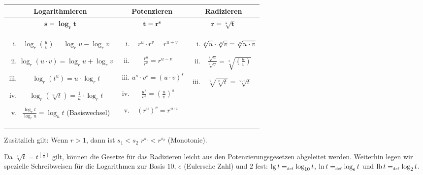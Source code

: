 \begin{center}
\begin{tabular}{c|c|c}
Logarithmieren & Potenzieren & Radizieren\\
\hline
$\mathbf{s = \log_r t}$ & $\mathbf{t = r^s}$ &
\phantom{$\left(\frac{\frac{c}{d}a}{b}\right)$} $\mathbf{r = \sqrt[\mathbf{s}]{\mathbf{t}}}$\\
\hline
\begin{minipage}[t]{0.38\textwidth}
\begin{enumerate}[i)]
%
\item $\log_r (\frac{u}{v}) = \log_r u - \log_r v$
%
\item $\log_r ({u} \cdot {v}) = \log_r u + \log_r v$
%
\item $\log_r (t^u) = u \cdot \log_r t$
%
\item $\log_r (\sqrt[u]{t}) = \frac{1}{u} \cdot \log_r t$
%
\item $\frac{\log_r t}{\log_r u} = \log_u t$ (Basiswechsel)
%
\end{enumerate}
\end{minipage}
&
\begin{minipage}[t]{0.25\textwidth}
\begin{enumerate}[i)]
%
\item $r^{u} \cdot r^{v} = r^{u + v}$
%
\item $\frac{r^{u}}{r^{v}} = r^{u - v}$
%
\item $u^{s} \cdot v^{s} = (u \cdot v)^{s}$
%
\item $\frac{u^{s}}{v^{s}} = \left(\frac{u}{v}\right)^{s}$
%
\item $(r^{u})^{v} = r^{u \cdot v}$ 
%
\end{enumerate}
\end{minipage}
&
\begin{minipage}[t]{0.28\textwidth}
%
\begin{enumerate}[i)]
%
\item $\sqrt[\leftroot{1} s]{u} \cdot \sqrt[s]{v} = \sqrt[s]{u \cdot v}$
%
\item $\frac{\sqrt[s]{u}}{\sqrt[s]{v}} = \sqrt[s]{\left(\frac{u}{v}\right)}$
%
\item $\sqrt[u]{\sqrt[v]{t}} =
  \sqrt[u \cdot v]{t}$
%
\end{enumerate}
\end{minipage}\\
\end{tabular}
\end{center}
Zusätzlich gilt: Wenn $r > 1$, dann ist $s_1 < s_2$ \gdw $r^{s_1} <
r^{s_2}$ (Monotonie).

Da $\sqrt[s]{t} = t^{\left(\frac{1}{s}\right)}$ gilt, können die
Gesetze für das Radizieren leicht aus den Potenzierungsgesetzen
abgeleitet werden.  Weiterhin legen wir spezielle Schreibweisen für
die Logarithmen zur Basis $10$, $e$ (Eulersche Zahl) und $2$ fest:
$\lg t =_{\mathrm{\scriptscriptstyle def}} \log_{10} t$, $\ln t =_{\mathrm{\scriptscriptstyle def}} \log_{e} t$ und $\mathrm{lb}\,
t =_{\mathrm{\scriptscriptstyle def}} \log_{2} t$.
